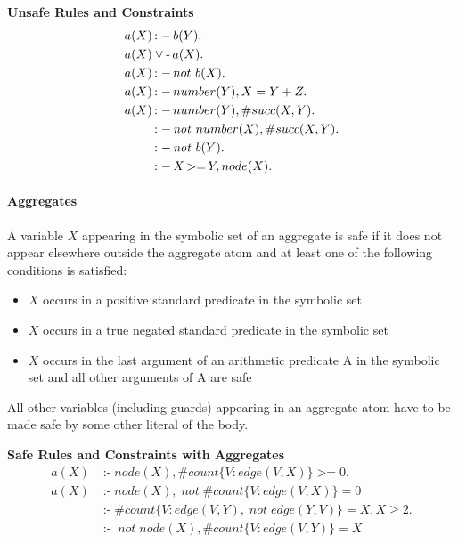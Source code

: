 \documentclass[a4paper, titlepage]{article}
\DeclareMathOperator{\leftimpl}{:-}
\DeclareMathOperator{\clasneg}{\text{-}}
\DeclareMathOperator{\nott}{\mathit{not}}
\DeclareMathOperator{\geeq}{>=}
\begin{document}
\begin{exmp} \textbf{Unsafe Rules and Constraints}
\begin{align*}
a(X)  & \leftimpl b(Y).\\
a(X) &\vee \clasneg a(X). \\
a(X)&\leftimpl not \ b(X). \\
a(X)&\leftimpl number(Y), X=Y+Z. \\
a(X)&\leftimpl number(Y), \#succ(X,Y). \\
    & \leftimpl \nott \thinspace number(X), \#succ(X,Y). \\
    & \leftimpl \nott \thinspace b(Y).\\
    & \leftimpl X \geeq Y, node(X). 
\end{align*}
\end{exmp}

\paragraph{Aggregates}
A variable $X$ appearing in the symbolic set of an aggregate is safe if it does not appear elsewhere outside the aggregate atom and at least one of the following conditions is satisfied:
\begin{itemize}
\item $X$ occurs in a positive standard predicate in the symbolic set
\item $X$ occurs in a true negated standard predicate in the symbolic set
\item $X$ occurs in the last argument of an arithmetic predicate A in the symbolic set and all other arguments of A are safe
\end{itemize}
All other variables (including guards) appearing in an aggregate atom have to be made safe by some other literal of the body.
\begin{exmp} \textbf{Safe Rules and Constraints with Aggregates}
\begin{align*}
a(X) & \leftimpl node(X), \#count\{ V \colon edge(V,X)\} \geeq 0. \\
a(X) & \leftimpl node(X), \nott \#count\{ V \colon edge(V,X)\} = 0\\
& \leftimpl \#count\{V \colon edge(V,Y), \nott edge(Y,V)\}=X, X\geq2.\\
& \leftimpl \nott node(X), \#count\{ V \colon edge(V,Y)\}=X\\
\end{align*}
\end{exmp}
\end{document}

